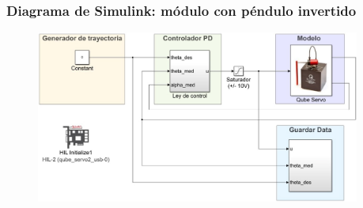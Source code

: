 \begin{frame}
\frametitle{Diagrama de Simulink: módulo con péndulo invertido}
\begin{figure}
\centering
\includegraphics[width=0.95\textwidth]{simulink_qube_pendulum.jpeg}
\end{figure}

\end{frame}

